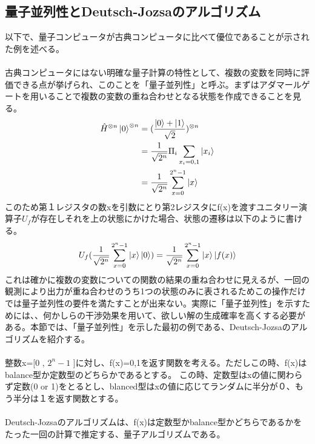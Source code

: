 \documentclass[a4paper,10.5pt]{article}
\numberwithin{equation}{section}
\begin{document}
\subsection{量子並列性とDeutsch-Jozsaのアルゴリズム}
以下で、量子コンピュータが古典コンピュータに比べて優位であることが示された例を述べる。\\
\\
古典コンピュータにはない明確な量子計算の特性として、複数の変数を同時に評価できる点が挙げられ、このことを「量子並列性」と呼ぶ。まずはアダマールゲートを用いることで複数の変数の重ね合わせとなる状態を作成できることを見る。
 \begin{equation}\begin{split}
     \hat{H}^{\otimes n}\ket{0}^{\otimes n} 
     &= (\frac{\ket{0}+\ket{1}}{\sqrt{2}})^{\otimes n} \\
     &= \frac{1}{\sqrt{2^{n}}} \Pi_{i} \sum_{x_{i}=0,1} \ket{x_{i}}\\
     &= \frac{1}{\sqrt{2^{n}}} \sum_{x=0}^{2^{n}-1} \ket{x}
 \end{split} \end{equation}
このため第１レジスタの数xを引数にとり第2レジスタにf(x)を渡すユニタリー演算子$U_{f}$が存在しそれを上の状態にかけた場合、状態の遷移は以下のように書ける。
\begin{equation}\begin{split}
    U_{f} (\frac{1}{\sqrt{2^{n}}} \sum_{x=0}^{2^{n}-1} \ket{x} \ket{0})
    = \frac{1}{\sqrt{2^{n}}} \sum_{x=0}^{2^{n}-1} \ket{x} \ket{f(x)}
\end{split} \end{equation}
これは確かに複数の変数についての関数の結果の重ね合わせに見えるが、一回の観測により出力が重ね合わせのうち1つの状態のみに表されるためこの操作だけでは量子並列性の要件を満たすことが出来ない。実際に「量子並列性」を示すためには、、何かしらの干渉効果を用いて、欲しい解の生成確率を高くする必要がある。本節では、「量子並列性」を示した最初の例である、Deutsch-Jozsaのアルゴリズムを紹介する。\\
\\
整数x=[0 , $2^{n}-1$ ]に対し、f(x)={0,1}を返す関数を考える。ただしこの時、f(x)はbalance型か定数型のどちらかであるとする。
この時、定数型はxの値に関わらず定数(0 or 1)をとるとし、blanced型はxの値に応じてランダムに半分が０、もう半分は１を返す関数とする。\\
\\
Deutsch-Jozsaのアルゴリズムは、f(x)は定数型かbalance型かどちらであるかをたった一回の計算で推定する、量子アルゴリズムである。\\
\end{document}
